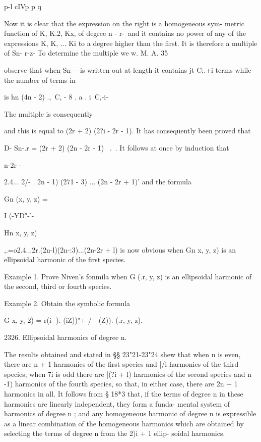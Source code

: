 {{p-l cIVp p q

Now it is clear that the expression on the right is a homogeneous sym-
metric function of K, K.2, Kx, of degree n - r-\, and it contains
no power of any of the expressions K, K, ... Ki to a degree higher
than the first. It is therefore a multiple of Sn- r-z- To determine
the multiple we w. M. A. 35

%
%

observe that when Sn- - is written out at length it contains jt C;.+i
terms while the number of terms in

is hn (4n - 2) ., \,C, - 8 . a . i \,C,-i-

The multiple is consequently

and this is equal to (2r + 2) (2?i - 2r - 1). It has consequently been
proved that

D- Sn-.r = (2r + 2) (2n - 2r - 1) \ . \,. It follows at once by
induction that

 n-2r -

2.4... 2/- . 2n - 1) (271 - 3) ... (2n - 2r + 1)' and the formula

Gn (x, y, z) =

I (-YD"-'-

Hn x, y, z)

,.=o2.4...2r.(2n-l)(2n-:3)...(2n-2r + l) is now obvious when Gn x, y,
z) is an ellipsoidal harmonic of the first species.

Example 1. Prove Niven's fonmila when G (.r, y, z) is an ellipsoidal
harmonic of the second, third or fourth species.

Example 2. Obtain the symbolic formula

G x, y, 2) = r(i- ). (iZ))"+ /\ \ (Z)). (.r, y, z).

2326. Ellipsoidal harmonics of degree n.

The results obtained and stated in §§ 23"21-23"24 shew that when n is
even, there are n + 1 harmonics of the first species and |/i harmonics
of the third species; when 7i is odd there are |(?i + l) harmonics of
the second species and n -1) harmonics of the fourth species, so that,
in either case, there are 2n + 1 harmonics in all. It follows from §
18*3 that, if the terms of degree n in these harmonics are linearly
independent, they form a funda- mental system of harmonics of degree n
; and any homogeneous harmonic of degree n is expressible as a linear
combination of the homogeneous harmonics which are obtained by
selecting the terms of degree n from the 2)i + 1 ellip- soidal
harmonics.

}}
